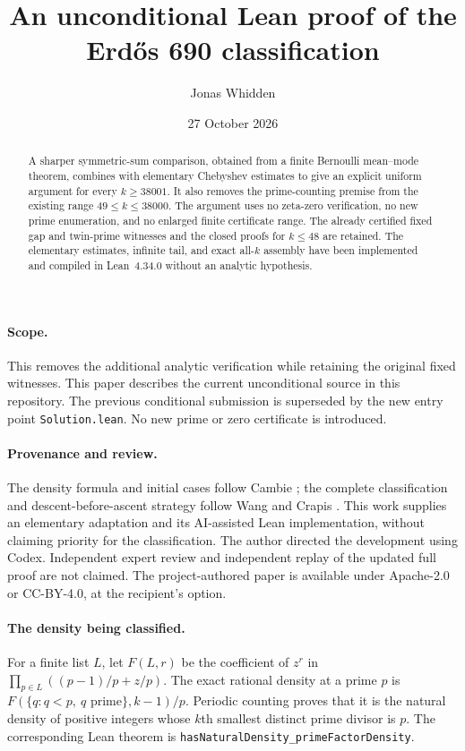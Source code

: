 \documentclass[11pt]{article}
\title{An unconditional Lean proof of the Erd\H{o}s 690 classification}
\author{Jonas Whidden}
\date{27 October 2026}
\begin{document}
\maketitle
\begin{abstract}
A sharper symmetric-sum comparison, obtained from a finite Bernoulli
mean--mode theorem, combines with elementary Chebyshev estimates to give an
explicit uniform argument for every $k\ge38001$. It also removes the
prime-counting premise from the existing range $49\le k\le38000$.
The argument uses no zeta-zero verification, no new prime enumeration, and
no enlarged finite certificate range. The already certified fixed gap and
twin-prime witnesses and the closed proofs for $k\le48$ are retained.
The elementary estimates, infinite tail, and exact all-$k$ assembly have
been implemented and compiled in Lean~4.34.0 without an analytic hypothesis.
\end{abstract}

\paragraph{Scope.}
This removes the additional analytic verification while retaining the original
fixed witnesses. This paper describes the current unconditional source in this repository.
The previous conditional submission \cite{submission} is superseded by the
new entry point \texttt{Solution.lean}.
No new prime or zero certificate is introduced.

\paragraph{Provenance and review.}
The density formula and initial cases follow Cambie \cite{cambie}; the
complete classification and descent-before-ascent strategy follow Wang and
Crapis \cite{wang}. This work supplies an elementary adaptation and its
AI-assisted Lean implementation, without claiming priority for the
classification. The author directed the development using Codex.
Independent expert review and independent replay of the updated full proof
are not claimed. The project-authored paper is available under Apache-2.0
or CC-BY-4.0, at the recipient's option.

\paragraph{The density being classified.}
For a finite list $L$, let $F(L,r)$ be the coefficient of $z^r$ in
$\prod_{p\in L}((p-1)/p+z/p)$. The exact rational density at a prime $p$ is
$F(\{q:q<p,\ q\text{ prime}\},k-1)/p$.
Periodic counting proves that it is the natural density of positive integers
whose $k$th smallest distinct prime divisor is $p$.
The corresponding Lean theorem is
\texttt{hasNaturalDensity\_primeFactorDensity}.
\end{document}

